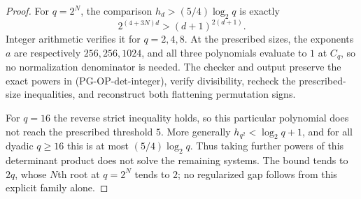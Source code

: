 \begin{proof}
For $q=2^N$, the comparison $h_d>(5/4)\log_2q$ is exactly
\[
 2^{(4+3N)d}>(d+1)^{2(d+1)}.
 \tag{PG-OP-det-integer}
\]
Integer arithmetic verifies it for $q=2,4,8$. At the prescribed sizes,
the exponents $a$ are respectively $256,256,1024$, and all three
polynomials evaluate to $1$ at $C_q$, so no normalization denominator
is needed. The checker 
and output 
preserve the exact powers in (PG-OP-det-integer), verify divisibility,
recheck the prescribed-size inequalities, and reconstruct both
flattening permutation signs.

For $q=16$ the reverse strict inequality holds, so this particular
polynomial does not reach the prescribed threshold $5$. More generally
$h_{q^2}<\log_2q+1$, and for all dyadic $q\geq16$ this is at most
$(5/4)\log_2q$. Thus taking further powers of this determinant product
does not solve the remaining systems. The bound tends to $2q$, whose
$N$th root at $q=2^N$ tends to $2$; no regularized gap follows from this
explicit family alone.
\end{proof}


